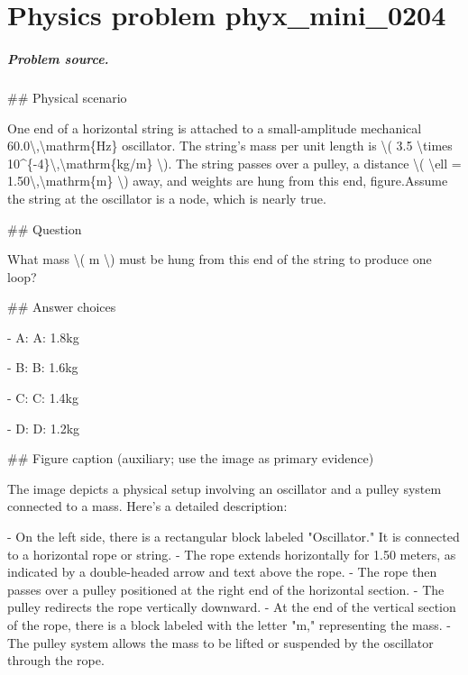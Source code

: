 
\chapter{Physics problem phyx\_mini\_0204}
\label{ch:PhyXMiniProblems_problem_phyx_mini_0204}

\paragraph{Problem source.}
\#\# Physical scenario

One end of a horizontal string is attached to a small-amplitude mechanical 60.0\textbackslash{},\textbackslash{}mathrm\{Hz\} oscillator. The string's mass per unit length is \textbackslash{}( 3.5 \textbackslash{}times 10\textasciicircum{}\{-4\}\textbackslash{},\textbackslash{}mathrm\{kg/m\} \textbackslash{}). The string passes over a pulley, a distance \textbackslash{}( \textbackslash{}ell = 1.50\textbackslash{},\textbackslash{}mathrm\{m\} \textbackslash{}) away, and weights are hung from this end, figure.Assume the string at the oscillator is a node, which is nearly true.

\#\# Question

What mass \textbackslash{}( m \textbackslash{}) must be hung from this end of the string to produce one loop?

\#\# Answer choices

- A: A: 1.8kg

- B: B: 1.6kg

- C: C: 1.4kg

- D: D: 1.2kg

\#\# Figure caption (auxiliary; use the image as primary evidence)

The image depicts a physical setup involving an oscillator and a pulley system connected to a mass. Here's a detailed description:

- On the left side, there is a rectangular block labeled "Oscillator." It is connected to a horizontal rope or string.
- The rope extends horizontally for 1.50 meters, as indicated by a double-headed arrow and text above the rope.
- The rope then passes over a pulley positioned at the right end of the horizontal section.
- The pulley redirects the rope vertically downward.
- At the end of the vertical section of the rope, there is a block labeled with the letter "m," representing the mass.
- The pulley system allows the mass to be lifted or suspended by the oscillator through the rope.

